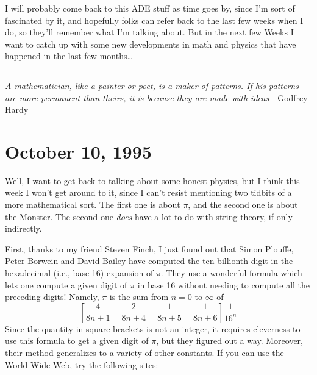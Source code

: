 \documentclass{article}
\renewcommand{\texttt}[1]{%
  \begingroup
  \ttfamily
  \begingroup\lccode`~=`/\lowercase{\endgroup\def~}{/\discretionary{}{}{}}%
  \begingroup\lccode`~=`[\lowercase{\endgroup\def~}{[\discretionary{}{}{}}%
  \begingroup\lccode`~=`.\lowercase{\endgroup\def~}{.\discretionary{}{}{}}%
  \catcode`/=\active\catcode`[=\active\catcode`.=\active
  \scantokens{#1\noexpand}%
  \endgroup
}
\begin{document}
I will probably come back to this ADE stuff as time goes by, since I'm
sort of fascinated by it, and hopefully folks can refer back to the last
few weeks when I do, so they'll remember what I'm talking about. But in
the next few Weeks I want to catch up with some new developments in math
and physics that have happened in the last few months\ldots{}

\begin{center}\rule{0.5\linewidth}{0.5pt}\end{center}

\emph{A mathematician, like a painter or poet, is a maker of patterns.
If his patterns are more permanent than theirs, it is because they are
made with ideas} - Godfrey Hardy
\hypertarget{week66}{%
\section{October 10, 1995}\label{week66}}

Well, I want to get back to talking about some honest physics, but I
think this week I won't get around to it, since I can't resist
mentioning two tidbits of a more mathematical sort. The first one is
about \(\pi\), and the second one is about the Monster. The second one
\emph{does} have a lot to do with string theory, if only indirectly.

First, thanks to my friend Steven Finch, I just found out that Simon
Plouffe, Peter Borwein and David Bailey have computed the ten billionth
digit in the hexadecimal (i.e., base 16) expansion of \(\pi\). They use
a wonderful formula which lets one compute a given digit of \(\pi\) in
base 16 without needing to compute all the preceding digits! Namely,
\(\pi\) is the sum from \(n = 0\) to \(\infty\) of \[
  \left[
    \frac{4}{8n+1} -\frac{2}{8n+4} -\frac{1}{8n+5} -\frac{1}{8n+6}
  \right] \frac{1}{16^n}
\] Since the quantity in square brackets is not an integer, it requires
cleverness to use this formula to get a given digit of \(\pi\), but they
figured out a way. Moreover, their method generalizes to a variety of
other constants. If you can use the World-Wide Web, try the following
sites:

\end{document}
